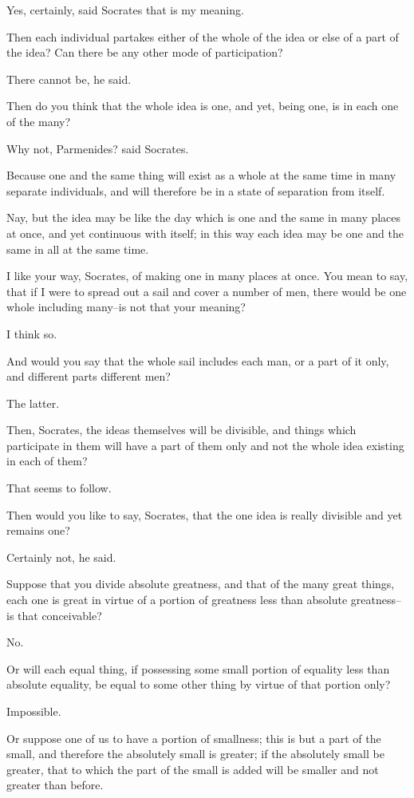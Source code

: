 Yes, certainly, said Socrates that is my meaning.

Then each individual partakes either of the whole of the idea or else of
a part of the idea? Can there be any other mode of participation?

There cannot be, he said.

Then do you think that the whole idea is one, and yet, being one, is in
each one of the many?

Why not, Parmenides? said Socrates.

Because one and the same thing will exist as a whole at the same time
in many separate individuals, and will therefore be in a state of
separation from itself.

Nay, but the idea may be like the day which is one and the same in many
places at once, and yet continuous with itself; in this way each idea
may be one and the same in all at the same time.

I like your way, Socrates, of making one in many places at once. You
mean to say, that if I were to spread out a sail and cover a number of
men, there would be one whole including many--is not that your meaning?

I think so.

And would you say that the whole sail includes each man, or a part of it
only, and different parts different men?

The latter.

Then, Socrates, the ideas themselves will be divisible, and things which
participate in them will have a part of them only and not the whole idea
existing in each of them?

That seems to follow.

Then would you like to say, Socrates, that the one idea is really
divisible and yet remains one?

Certainly not, he said.

Suppose that you divide absolute greatness, and that of the many great
things, each one is great in virtue of a portion of greatness less than
absolute greatness--is that conceivable?

No.

Or will each equal thing, if possessing some small portion of equality
less than absolute equality, be equal to some other thing by virtue of
that portion only?

Impossible.

Or suppose one of us to have a portion of smallness; this is but a part
of the small, and therefore the absolutely small is greater; if the
absolutely small be greater, that to which the part of the small is
added will be smaller and not greater than before.

